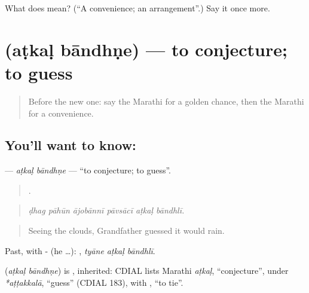 \begin{tcolorbox}[breakable,colback=teal!4,colframe=teal!35!black,title={Before you move on}]
What does  mean? (\textquotedblleft{}A convenience; an arrangement\textquotedblright{}.) Say it once more.
\end{tcolorbox}
\section[\texorpdfstring{\mr{अटकळ} \mr{बांधणे} (aṭkaḷ bāndhṇe)}{अटकळ बांधणे (aṭkaḷ bāndhṇe)}]{  (aṭkaḷ bāndhṇe) — to conjecture; to guess}

\label{lesson:MR-C545-atkal-bandhne}



\begin{quote}
Before the new one: say the Marathi for a golden chance, then the Marathi for a convenience.
\end{quote}

\subsection*{You'll want to know:  }
\textbf{ } — \emph{aṭkaḷ bāndhṇe} — \textquotedblleft{}to conjecture; to guess\textquotedblright{}.

\begin{quote}
     .
\end{quote}

\begin{quote}
\emph{ḍhag pāhūn ājobānnī pāvsācī aṭkaḷ bāndhlī.}
\end{quote}

\begin{quote}
Seeing the clouds, Grandfather guessed it would rain.
\end{quote}

Past, with - (he …):   , \emph{tyāne aṭkaḷ bāndhlī}.

\begin{cousinweb}
\textbf{ } (\emph{aṭkaḷ bāndhṇe}) is , inherited: CDIAL lists Marathi \emph{aṭkaḷ}, \textquotedblleft{}conjecture\textquotedblright{}, under \emph{*aṭṭakkalā}, \textquotedblleft{}guess\textquotedblright{} (CDIAL 183), with , \textquotedblleft{}to tie\textquotedblright{}.
\end{cousinweb}

